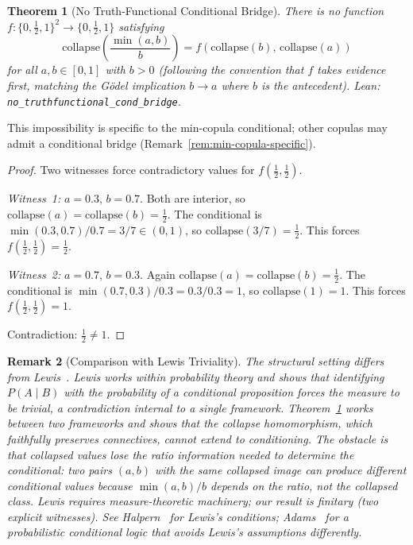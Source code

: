 \documentclass[11pt,a4paper]{article}
\newtheorem{theorem}{Theorem}[section]
\newtheorem{remark}[theorem]{Remark}
\begin{document}
\begin{theorem}[No Truth-Functional Conditional Bridge]
\label{thm:no-cond-bridge}
There is no function
$f : \{0, \tfrac{1}{2}, 1\}^2 \to \{0, \tfrac{1}{2}, 1\}$
satisfying
\[
\mathrm{collapse}\!\left(\frac{\min(a,b)}{b}\right)
= f(\mathrm{collapse}(b),\, \mathrm{collapse}(a))
\]
for all $a, b \in [0,1]$ with $b > 0$
(following the convention that $f$ takes evidence first, matching
the G\"odel implication $b \to a$ where $b$ is the antecedent).
Lean: \texttt{no\_truthfunctional\_cond\_bridge}.
\end{theorem}

This impossibility is specific to the min-copula conditional;
other copulas may admit a conditional bridge
(Remark~\ref{rem:min-copula-specific}).

\begin{proof}
Two witnesses force contradictory values for
$f(\tfrac{1}{2}, \tfrac{1}{2})$.

\emph{Witness~1:}
$a = 0.3$, $b = 0.7$.
Both are interior, so
$\mathrm{collapse}(a) = \mathrm{collapse}(b) = \tfrac{1}{2}$.
The conditional is $\min(0.3, 0.7)/0.7 = 3/7 \in (0,1)$,
so $\mathrm{collapse}(3/7) = \tfrac{1}{2}$.
This forces $f(\tfrac{1}{2}, \tfrac{1}{2}) = \tfrac{1}{2}$.

\emph{Witness~2:}
$a = 0.7$, $b = 0.3$.
Again $\mathrm{collapse}(a) = \mathrm{collapse}(b) = \tfrac{1}{2}$.
The conditional is $\min(0.7, 0.3)/0.3 = 0.3/0.3 = 1$,
so $\mathrm{collapse}(1) = 1$.
This forces $f(\tfrac{1}{2}, \tfrac{1}{2}) = 1$.

Contradiction: $\tfrac{1}{2} \neq 1$.
\end{proof}

\begin{remark}[Comparison with Lewis Triviality]
\label{rem:lewis}
The structural setting differs from Lewis~\cite{lewis1976}.
Lewis works \emph{within} probability theory and shows that
identifying $P(A \mid B)$ with the probability of a conditional
proposition forces the measure to be trivial, a contradiction
internal to a single framework.
Theorem~\ref{thm:no-cond-bridge} works \emph{between} two
frameworks and shows that the collapse homomorphism, which faithfully
preserves connectives, cannot extend to conditioning.
The obstacle is that collapsed values lose the ratio
information needed to determine the conditional:
two pairs $(a, b)$ with the same collapsed image can produce
different conditional values because $\min(a,b)/b$ depends on the
ratio, not the collapsed class.
Lewis requires measure-theoretic machinery; our result is finitary
(two explicit witnesses).
See Halpern~\cite{halpern2003} for Lewis's conditions;
Adams~\cite{adams1975} for a probabilistic conditional logic that
avoids Lewis's assumptions differently.
\end{remark}
\end{document}
